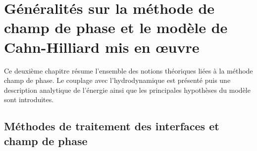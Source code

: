 \chapter{Généralités sur la méthode de champ de phase et le modèle de Cahn-Hilliard mis en \oe uvre} \label{chap:2}
Ce deuxième chapitre résume l'ensemble des notions théoriques liées à la méthode champ de phase. Le couplage avec l'hydrodynamique est présenté puis une description analytique de l'énergie ainsi que les principales hypothèses du modèle sont introduites. 
\section{Méthodes de traitement des interfaces et champ de phase}

